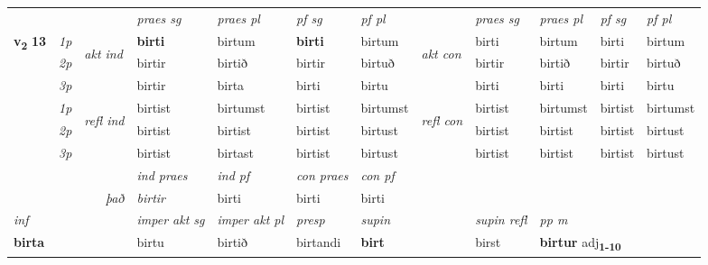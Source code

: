 \begin{longtable}[l]{X>{\footnotesize\itshape}llXXXXlXXXX}
 & &   & \textit{praes sg}  & \textit{praes pl}    & \textit{ pf sg} & \textit{pf pl} & & \textit{praes sg}  & \textit{praes pl}    & \textit{pf sg} & \textit{pf pl }  \\ \cmidrule{4-7} \cmidrule{9-12}
 \multirow{2}{*}{{{\textbf{v{\textsubscript{2}}} \Large{\textbf{13}}}}}  & 1p & \multirow{3}{*}{\begin{turn}{90}\textit{akt ind}\end{turn}} & \textbf{birti} & birtum & \textbf{birti} & birtum & \multirow{3}{*}{\begin{turn}{90}\textit{akt con}\end{turn}} &birti & birtum & birti & birtum\\*
 & 2p &  &  birtir  & birtið & birtir & birtuð & & birtir & birtið & birtir & birtuð \\*
 & 3p &  & birtir & birta & birti & birtu & & birti & birti& birti & birtu \\*
\cmidrule{4-7} \cmidrule{9-12}
 & 1p & \multirow{3}{*}{\begin{turn}{90}\textit{refl ind}\end{turn}}  & birtist & birtumst & birtist & birtumst & \multirow{3}{*}{\begin{turn}{90}\textit{refl con}\end{turn}}  &birtist & birtumst & birtist & birtumst \\*
 & 2p &  & birtist & birtist & birtist & birtust & &birtist & birtist & birtist & birtust \\*
 & 3p  & & birtist & birtast & birtist & birtust & & birtist & birtist& birtist & birtust \\*
\cmidrule{4-7} \cmidrule{9-12}

   && &  \textit{ind praes} & \textit{ind pf} & \textit{con praes} & \textit{con pf} \\*
\multicolumn{3}{r}{\textit{það}} & birtir & birti & birti & birti \\*

\cmidrule{4-7}
   {\textit{inf}} & &  & \textit{imper akt sg} & \textit{imper akt pl}   & \textit{presp} & \textit{supin} && \textit{supin refl} & \textit{pp m} \\*
  {\textbf{birta}} & && birtu  & birtið   & birtandi &  \textbf{birt} && birst & \multicolumn{2}{l}{\textbf{birtur} adj\textbf{\textsubscript{1-10}}} \\*

\midrule


\end{longtable}
